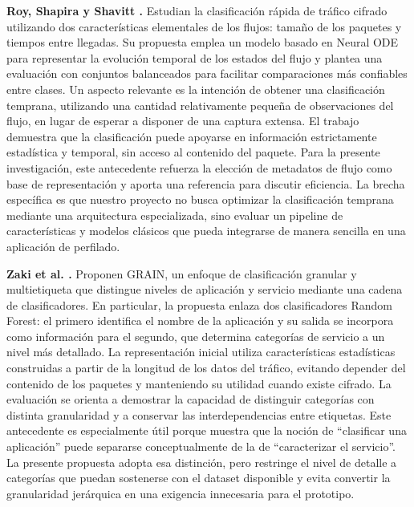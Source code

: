 \documentclass[conference]{IEEEtran}
\begin{document}
\textbf{Roy, Shapira y Shavitt \cite{roy2022}.} Estudian la clasificación rápida de tráfico cifrado utilizando dos características elementales de los flujos: tamaño de los paquetes y tiempos entre llegadas. Su propuesta emplea un modelo basado en Neural ODE para representar la evolución temporal de los estados del flujo y plantea una evaluación con conjuntos balanceados para facilitar comparaciones más confiables entre clases. Un aspecto relevante es la intención de obtener una clasificación temprana, utilizando una cantidad relativamente pequeña de observaciones del flujo, en lugar de esperar a disponer de una captura extensa. El trabajo demuestra que la clasificación puede apoyarse en información estrictamente estadística y temporal, sin acceso al contenido del paquete. Para la presente investigación, este antecedente refuerza la elección de metadatos de flujo como base de representación y aporta una referencia para discutir eficiencia. La brecha específica es que nuestro proyecto no busca optimizar la clasificación temprana mediante una arquitectura especializada, sino evaluar un pipeline de características y modelos clásicos que pueda integrarse de manera sencilla en una aplicación de perfilado.

\textbf{Zaki et al. \cite{zaki2022}.} Proponen GRAIN, un enfoque de clasificación granular y multietiqueta que distingue niveles de aplicación y servicio mediante una cadena de clasificadores. En particular, la propuesta enlaza dos clasificadores Random Forest: el primero identifica el nombre de la aplicación y su salida se incorpora como información para el segundo, que determina categorías de servicio a un nivel más detallado. La representación inicial utiliza características estadísticas construidas a partir de la longitud de los datos del tráfico, evitando depender del contenido de los paquetes y manteniendo su utilidad cuando existe cifrado. La evaluación se orienta a demostrar la capacidad de distinguir categorías con distinta granularidad y a conservar las interdependencias entre etiquetas. Este antecedente es especialmente útil porque muestra que la noción de ``clasificar una aplicación'' puede separarse conceptualmente de la de ``caracterizar el servicio''. La presente propuesta adopta esa distinción, pero restringe el nivel de detalle a categorías que puedan sostenerse con el dataset disponible y evita convertir la granularidad jerárquica en una exigencia innecesaria para el prototipo.
\end{document}
